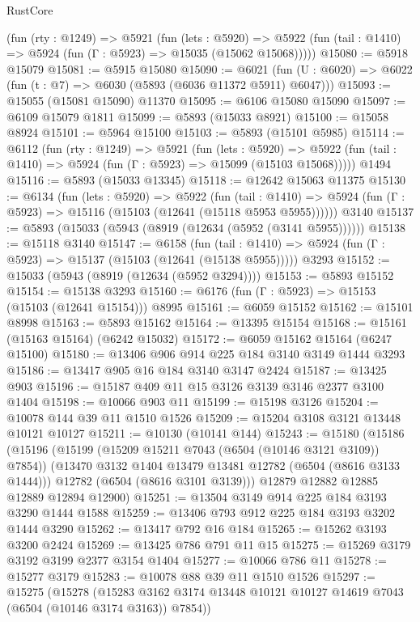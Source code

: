 \begin{lexlean}{RustCore}
\begin{coremodule}
    (fun (rty : @1249) =>
    @5921
      (fun (lets : @5920) =>
      @5922 (fun (tail : @1410) => @5924 (fun (Γ : @5923) => @15035 (@15062 @15068)))))
@15080 := @5918 @15079
@15081 := @5915 @15080
@15090 := @6021
    (fun (U : @6020) => @6022 (fun (t : @7) => @6030 (@5893 (@6036 @11372 @5911) @6047)))
@15093 := @15055 (@15081 @15090) @11370
@15095 := @6106 @15080 @15090
@15097 := @6109 @15079 @1811
@15099 := @5893 (@15033 @8921)
@15100 := @15058 @8924
@15101 := @5964 @15100
@15103 := @5893 (@15101 @5985)
@15114 := @6112
    (fun (rty : @1249) =>
    @5921
      (fun (lets : @5920) =>
      @5922 (fun (tail : @1410) => @5924 (fun (Γ : @5923) => @15099 (@15103 @15068)))))
    @1494
@15116 := @5893 (@15033 @13345)
@15118 := @12642 @15063 @11375
@15130 := @6134
    (fun (lets : @5920) =>
    @5922
      (fun (tail : @1410) =>
      @5924 (fun (Γ : @5923) => @15116 (@15103 (@12641 (@15118 @5953 @5955))))))
    @3140
@15137 := @5893 (@15033 (@5943 (@8919 (@12634 (@5952 (@3141 @5955))))))
@15138 := @15118 @3140
@15147 := @6158
    (fun (tail : @1410) => @5924 (fun (Γ : @5923) => @15137 (@15103 (@12641 (@15138 @5955)))))
    @3293
@15152 := @15033 (@5943 (@8919 (@12634 (@5952 @3294))))
@15153 := @5893 @15152
@15154 := @15138 @3293
@15160 := @6176 (fun (Γ : @5923) => @15153 (@15103 (@12641 @15154))) @8995
@15161 := @6059 @15152
@15162 := @15101 @8998
@15163 := @5893 @15162
@15164 := @13395 @15154
@15168 := @15161 (@15163 @15164) (@6242 @15032)
@15172 := @6059 @15162 @15164 (@6247 @15100)
@15180 := @13406 @906 @914 @225 @184 @3140 @3149 @1444 @3293
@15186 := @13417 @905 @16 @184 @3140 @3147 @2424
@15187 := @13425 @903
@15196 := @15187 @409 @11 @15 @3126 @3139 @3146 @2377 @3100 @1404
@15198 := @10066 @903 @11
@15199 := @15198 @3126
@15204 := @10078 @144 @39 @11 @1510 @1526
@15209 := @15204 @3108 @3121 @13448 @10121 @10127
@15211 := @10130 (@10141 @144)
@15243 := @15180
    (@15186
      (@15196
        (@15199 (@15209 @15211 @7043 (@6504 (@10146 @3121 @3109)) @7854))
        (@13470 @3132 @1404 @13479 @13481 @12782 (@6504 (@8616 @3133 @1444)))
        @12782
        (@6504 (@8616 @3101 @3139)))
      @12879
      @12882
      @12885
      @12889
      @12894
      @12900)
@15251 := @13504 @3149 @914 @225 @184 @3193 @3290 @1444 @1588
@15259 := @13406 @793 @912 @225 @184 @3193 @3202 @1444 @3290
@15262 := @13417 @792 @16 @184
@15265 := @15262 @3193 @3200 @2424
@15269 := @13425 @786 @791 @11 @15
@15275 := @15269 @3179 @3192 @3199 @2377 @3154 @1404
@15277 := @10066 @786 @11
@15278 := @15277 @3179
@15283 := @10078 @88 @39 @11 @1510 @1526
@15297 := @15275
    (@15278
      (@15283 @3162 @3174 @13448 @10121 @10127 @14619 @7043 (@6504 (@10146 @3174 @3163)) @7854))

\end{coremodule}
\end{lexlean}
